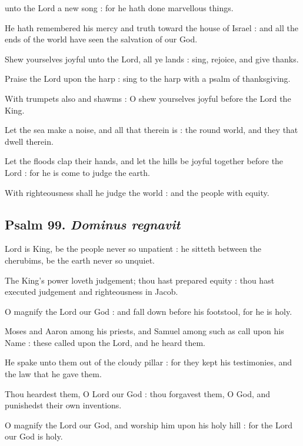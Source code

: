  unto the Lord a new song : for he hath done marvellous things.\par
{}
He hath remembered his mercy and truth toward the house of Israel : and all the ends of the world have seen the salvation of our God.\par
{}Shew yourselves joyful unto the Lord, all ye lands : sing, rejoice, and give thanks.\par
{}Praise the Lord upon the harp : sing to the harp with a psalm of thanksgiving.\par
{}With trumpets also and shawms : O shew yourselves joyful before the Lord the King.\par
{}Let the sea make a noise, and all that therein is : the round world, and they that dwell therein.\par
{}Let the floods clap their hands, and let the hills be joyful together before the Lord : for he is come to judge the earth.\par
{}With righteousness shall he judge the world : and the people with equity.\par

\subsection{Psalm 99. \textit{Dominus regnavit}}

 Lord is King, be the people never so unpatient : he sitteth between the cherubims, be the earth never so unquiet.\par
{}
The King's power loveth judgement; thou hast prepared equity : thou hast executed judgement and righteousness in Jacob.\par
{}O magnify the Lord our God : and fall down before his footstool, for he is holy.\par
{}Moses and Aaron among his priests, and Samuel among such as call upon his Name : these called upon the Lord, and he heard them.\par
{}He spake unto them out of the cloudy pillar : for they kept his testimonies, and the law that he gave them.\par
{}Thou heardest them, O Lord our God : thou forgavest them, O God, and punishedst their own inventions.\par
{}O magnify the Lord our God, and worship him upon his holy hill : for the Lord our God is holy.\par

